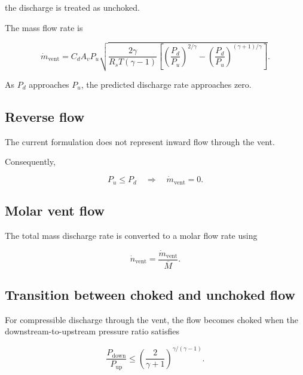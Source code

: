 the discharge is treated as unchoked.

The mass flow rate is

\begin{equation}
    \dot{m}_{\mathrm{vent}}
    =
    C_d A_v P_u
    \sqrt{
        \frac{2\gamma}
             {R_s T(\gamma-1)}
        \left[
            \left(
                \frac{P_d}{P_u}
            \right)^{2/\gamma}
            -
            \left(
                \frac{P_d}{P_u}
            \right)^{(\gamma+1)/\gamma}
        \right]
    }.
    \label{eq:unchoked_mass_flow}
\end{equation}

As $P_d$ approaches $P_u$, the predicted discharge rate approaches zero.


\subsection{Reverse flow}

The current formulation does not represent inward flow through the vent.

Consequently,

\begin{equation}
    P_u
    \leq
    P_d
    \quad
    \Longrightarrow
    \quad
    \dot{m}_{\mathrm{vent}}
    =
    0.
    \label{eq:no_reverse_flow}
\end{equation}


\subsection{Molar vent flow}

The total mass discharge rate is converted to a molar flow rate using

\begin{equation}
    \dot{n}_{\mathrm{vent}}
    =
    \frac{
        \dot{m}_{\mathrm{vent}}
    }{
        \overline{M}
    }.
    \label{eq:total_molar_vent_flow}
\end{equation}

\subsection{Transition between choked and unchoked flow}

For compressible discharge through the vent, the flow becomes choked
when the downstream-to-upstream pressure ratio satisfies

\begin{equation}
    \frac{P_{\mathrm{down}}}{P_{\mathrm{up}}}
    \leq
    \left(
        \frac{2}{\gamma+1}
    \right)^{
        \gamma/(\gamma-1)
    }.
    \label{eq:critical_pressure_ratio}
\end{equation}

